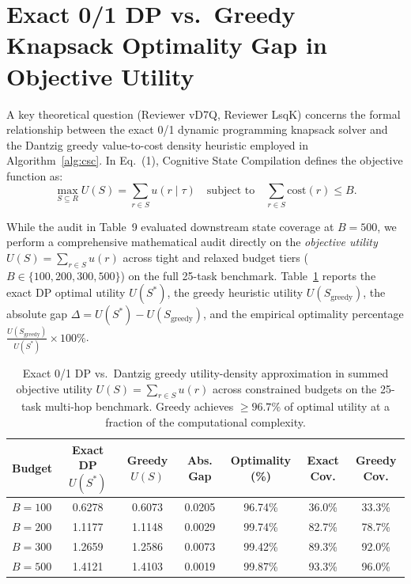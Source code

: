 \documentclass{article}
\begin{document}
\section{Exact 0/1 DP vs.\ Greedy Knapsack Optimality Gap in Objective Utility}
\label{app:knapsack_gap}

A key theoretical question (Reviewer vD7Q, Reviewer LsqK) concerns the formal relationship between the exact 0/1 dynamic programming knapsack solver and the Dantzig greedy value-to-cost density heuristic employed in Algorithm~\ref{alg:csc}. In Eq.~(1), Cognitive State Compilation defines the objective function as:
\begin{equation}
\max_{S \subseteq R} U(S) = \sum_{r \in S} u(r \mid \tau) \quad \text{subject to} \quad \sum_{r \in S} \text{cost}(r) \leq B.
\end{equation}

While the audit in Table~9 evaluated downstream state coverage at $B=500$, we perform a comprehensive mathematical audit directly on the \emph{objective utility} $U(S) = \sum_{r \in S} u(r)$ across tight and relaxed budget tiers ($B \in \{100, 200, 300, 500\}$) on the full 25-task benchmark. Table~\ref{tab:knapsack_gap_appendix} reports the exact DP optimal utility $U(S^*)$, the greedy heuristic utility $U(S_{\text{greedy}})$, the absolute gap $\Delta = U(S^*) - U(S_{\text{greedy}})$, and the empirical optimality percentage $\frac{U(S_{\text{greedy}})}{U(S^*)} \times 100\%$.

\begin{table}[h]
\centering
\small
\begin{tabular}{lcccccc}
\toprule
\textbf{Budget} & \textbf{Exact DP} $U(S^*)$ & \textbf{Greedy} $U(S)$ & \textbf{Abs. Gap} & \textbf{Optimality (\%)} & \textbf{Exact Cov.} & \textbf{Greedy Cov.} \\
\midrule
$B=100$ & 0.6278 & 0.6073 & 0.0205 & 96.74\% & 36.0\% & 33.3\% \\
$B=200$ & 1.1177 & 1.1148 & 0.0029 & 99.74\% & 82.7\% & 78.7\% \\
$B=300$ & 1.2659 & 1.2586 & 0.0073 & 99.42\% & 89.3\% & 92.0\% \\
$B=500$ & 1.4121 & 1.4103 & 0.0019 & 99.87\% & 93.3\% & 96.0\% \\
\bottomrule
\end{tabular}
\caption{Exact 0/1 DP vs.\ Dantzig greedy utility-density approximation in summed objective utility $U(S) = \sum_{r \in S} u(r)$ across constrained budgets on the 25-task multi-hop benchmark. Greedy achieves $\ge 96.7\%$ of optimal utility at a fraction of the computational complexity.}
\label{tab:knapsack_gap_appendix}
\end{table}
\end{document}
